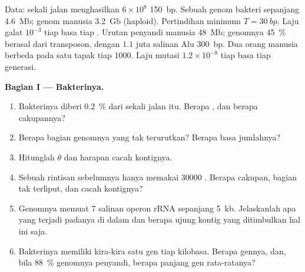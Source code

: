 \begin{problem}
\label{pb:b3:genomics:1}
Data: sekali jalan menghasilkan $6\times 10^{8}$  \qty{150}{bp}. Sebuah
genom bakteri sepanjang \qty{4.6}{Mb}; genom manusia \qty{3.2}{Gb}
(haploid). Pertindihan minimum $T = \qty{30}{bp}$. Laju galat $10^{-3}$
tiap basa tiap . Urutan penyandi manusia \qty{48}{Mb}; genomnya
\qty{45}{\%} berasal dari transposon, dengan $1.1$ juta salinan Alu
\qty{300}{bp}. Dua orang manusia berbeda pada satu tapak tiap \num{1000}. Laju
mutasi $1.2\times 10^{-8}$ tiap basa tiap generasi.

\medskip
\noindent\textbf{Bagian I --- Bakterinya.}
\begin{enumerate}
  \item Bakterinya diberi \qty{0.2}{\%} dari sekali jalan itu. Berapa
        , dan berapa cakupannya?
  \item Berapa bagian genomnya yang tak terurutkan? Berapa basa
        jumlahnya?
  \item Hitunglah $\theta$ dan harapan cacah kontignya.
  \item Sebuah rintisan sebelumnya hanya memakai \num{30000} .
        Berapa cakupan, bagian tak terliput, dan cacah kontignya?
  \item Genomnya memuat \num{7} salinan operon rRNA sepanjang
        \qty{5}{kb}. Jelaskanlah apa yang terjadi padanya di dalam
         dan berapa ujung kontig yang ditimbulkan hal ini saja.
  \item Bakterinya memiliki kira-kira satu gen tiap kilobasa. Berapa
        gennya, dan, bila \qty{88}{\%} genomnya penyandi, berapa panjang
        gen rata-ratanya?
\end{enumerate}


\end{problem}
